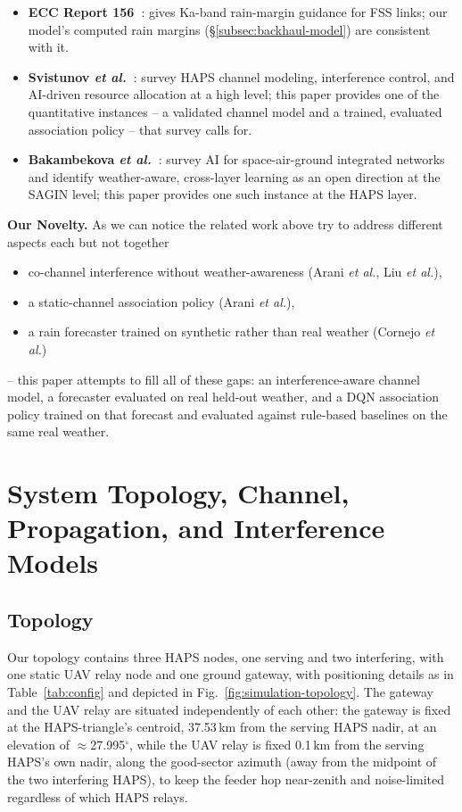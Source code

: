 \documentclass[]{ieeeaccess}
\begin{document}
\begin{itemize}
  \item \textbf{ECC Report 156~\cite{ecc_report_156}}: gives Ka-band rain-margin guidance for FSS links; our model's computed rain margins (\S\ref{subsec:backhaul-model}) are consistent with it.
  \item \textbf{Svistunov \emph{et al.}~\cite{svistunov2025haps}}: survey HAPS channel modeling, interference control, and AI-driven resource allocation at a high level; this paper provides one of the quantitative instances -- a validated channel model and a trained, evaluated association policy -- that survey calls for.
  \item \textbf{Bakambekova \emph{et al.}~\cite{bakambekova2024}}: survey AI for space-air-ground integrated networks and identify weather-aware, cross-layer learning as an open direction at the SAGIN level; this paper provides one such instance at the HAPS layer.
\end{itemize}

\textbf{Our Novelty.} As we can notice the related work above try to address different aspects each but not together 
\begin{itemize}
  \item[-] co-channel interference without weather-awareness (Arani \emph{et al.}, Liu \emph{et al.}), 
  \item[-] a static-channel association policy (Arani \emph{et al.}), 
  \item[-] a rain forecaster trained on synthetic rather than real weather (Cornejo \emph{et al.})
\end{itemize}
-- this paper attempts to fill all of these gaps: an interference-aware channel model, a forecaster evaluated on real held-out weather, and a DQN association policy trained on that forecast and evaluated against rule-based baselines on the same real weather.

\section{System Topology, Channel, Propagation, and Interference Models}
\label{sec:topology}

\subsection{Topology}

Our topology contains three HAPS nodes, one serving and two interfering, with one static UAV relay node and one ground gateway, with positioning details as in Table~\ref{tab:config} and depicted in Fig.~\ref{fig:simulation-topology}. The gateway and the UAV relay are situated independently of each other: the gateway is fixed at the HAPS-triangle's centroid, 37.53\,km from the serving HAPS nadir, at an elevation of $\approx$27.995$^\circ$, while the UAV relay is fixed 0.1\,km from the serving HAPS's own nadir, along the good-sector azimuth (away from the midpoint of the two interfering HAPS), to keep the feeder hop near-zenith and noise-limited regardless of which HAPS relays.
\end{document}

